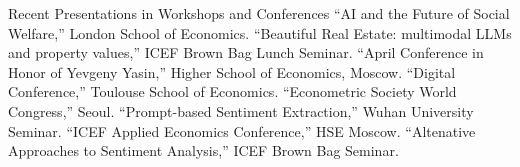 
\def\arraystretch{1.3}

\begin{rubric}{Recent Presentations in Workshops and Conferences}
 ``AI and the Future of Social Welfare,'' London School of Economics.
 ``Beautiful Real Estate: multimodal LLMs and property values,'' ICEF Brown Bag Lunch Seminar.
 ``April Conference in Honor of Yevgeny Yasin,'' Higher School of Economics, Moscow.
 ``Digital Conference,'' Toulouse School of Economics.
 ``Econometric Society World Congress,'' Seoul.
 ``Prompt-based Sentiment Extraction,'' Wuhan University Seminar.
 ``ICEF Applied Economics Conference,'' HSE Moscow.
 ``Altenative Approaches to Sentiment Analysis,'' ICEF Brown Bag Seminar.
\end{rubric}
